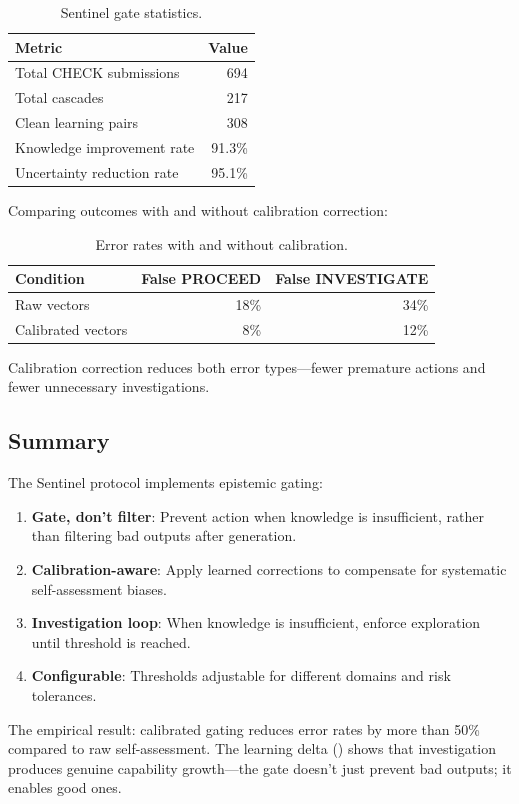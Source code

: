 \begin{table}[h]
\centering
\begin{tabular}{lr}
\toprule
\textbf{Metric} & \textbf{Value} \\
\midrule
Total CHECK submissions & 694 \\
Total cascades & 217 \\
Clean learning pairs & 308 \\
Knowledge improvement rate & 91.3\% \\
Uncertainty reduction rate & 95.1\% \\
\bottomrule
\end{tabular}
\caption{Sentinel gate statistics.}
\label{tab:gate-stats}
\end{table}

Comparing outcomes with and without calibration correction:

\begin{table}[h]
\centering
\begin{tabular}{lrr}
\toprule
\textbf{Condition} & \textbf{False PROCEED} & \textbf{False INVESTIGATE} \\
\midrule
Raw vectors & 18\% & 34\% \\
Calibrated vectors & 8\% & 12\% \\
\bottomrule
\end{tabular}
\caption{Error rates with and without calibration.}
\label{tab:error-rates}
\end{table}

Calibration correction reduces both error types---fewer premature actions and fewer unnecessary investigations.

\subsection{Summary}

The Sentinel protocol implements epistemic gating:

\begin{enumerate}
    \item \textbf{Gate, don't filter}: Prevent action when knowledge is insufficient, rather than filtering bad outputs after generation.

    \item \textbf{Calibration-aware}: Apply learned corrections to compensate for systematic self-assessment biases.

    \item \textbf{Investigation loop}: When knowledge is insufficient, enforce exploration until threshold is reached.

    \item \textbf{Configurable}: Thresholds adjustable for different domains and risk tolerances.
\end{enumerate}

The empirical result: calibrated gating reduces error rates by more than 50\% compared to raw self-assessment. The learning delta () shows that investigation produces genuine capability growth---the gate doesn't just prevent bad outputs; it enables good ones.
